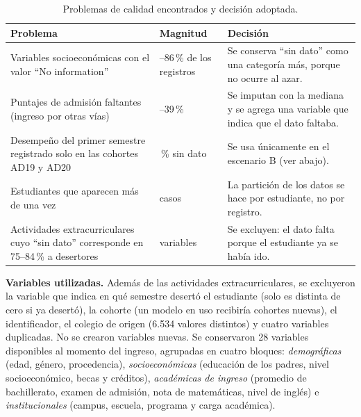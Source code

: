\documentclass[11pt,a4paper]{article}
\begin{document}
\begin{table}[!t]
\centering
\footnotesize
\caption{Problemas de calidad encontrados y decisión adoptada.}
\label{tab:calidad}
\begin{tabular}{>{\raggedright\arraybackslash}p{5.4cm}>{\raggedright\arraybackslash}p{2.6cm}>{\raggedright\arraybackslash}p{6.2cm}}
\toprule
Problema & Magnitud & Decisión \\
\midrule
Variables socioeconómicas con el valor ``No information'' & 45--86\,\% de los registros & Se conserva ``sin dato'' como una categoría más, porque no ocurre al azar. \\
Puntajes de admisión faltantes (ingreso por otras vías) & 33--39\,\% & Se imputan con la mediana y se agrega una variable que indica que el dato faltaba. \\
Desempeño del primer semestre registrado solo en las cohortes AD19 y AD20 & 68\,\% sin dato & Se usa únicamente en el escenario B (ver abajo). \\
Estudiantes que aparecen más de una vez & 80 casos & La partición de los datos se hace por estudiante, no por registro. \\
Actividades extracurriculares cuyo ``sin dato'' corresponde en 75--84\,\% a desertores & 9 variables & Se excluyen: el dato falta porque el estudiante ya se había ido. \\
\bottomrule
\end{tabular}
\end{table}

\textbf{Variables utilizadas.} Además de las actividades extracurriculares, se excluyeron la variable que indica en qué semestre desertó el estudiante (solo es distinta de cero si ya desertó), la cohorte (un modelo en uso recibiría cohortes nuevas), el identificador, el colegio de origen (6.534 valores distintos) y cuatro variables duplicadas. No se crearon variables nuevas. Se conservaron 28 variables disponibles al momento del ingreso, agrupadas en cuatro bloques: \emph{demográficas} (edad, género, procedencia), \emph{socioeconómicas} (educación de los padres, nivel socioeconómico, becas y créditos), \emph{académicas de ingreso} (promedio de bachillerato, examen de admisión, nota de matemáticas, nivel de inglés) e \emph{institucionales} (campus, escuela, programa y carga académica).
\end{document}
